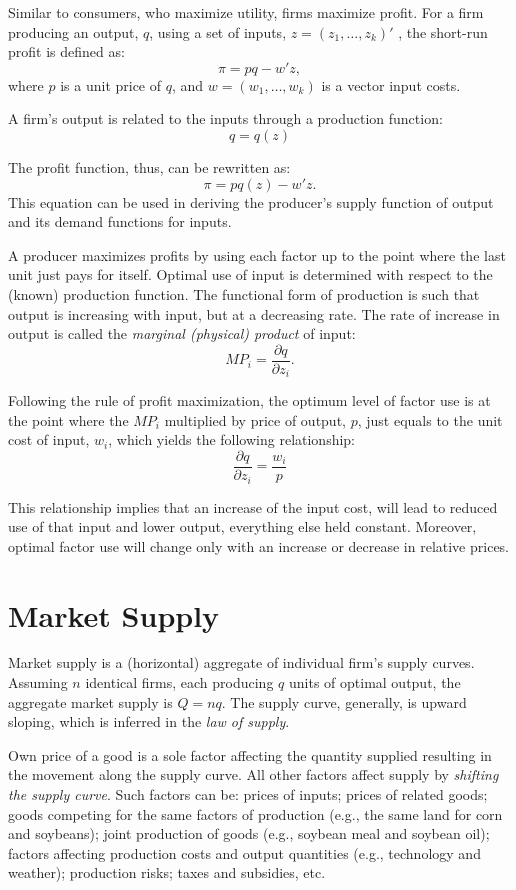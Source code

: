 \documentclass[
  oneside]{book}
\begin{document}
Similar to consumers, who maximize utility, firms maximize profit. For a firm producing an output, \(q\), using a set of inputs, \(z=(z_1,\ldots,z_k)'\) , the short-run profit is defined as: \[\pi = pq-w'z,\] where \(p\) is a unit price of \(q\), and \(w=(w_1,\ldots,w_k)\) is a vector input costs.

A firm's output is related to the inputs through a production function: \[q = q(z)\]

The profit function, thus, can be rewritten as: \[\pi = pq(z)-w'z.\] This equation can be used in deriving the producer's supply function of output and its demand functions for inputs.

A producer maximizes profits by using each factor up to the point where the last unit just pays for itself. Optimal use of input is determined with respect to the (known) production function. The functional form of production is such that output is increasing with input, but at a decreasing rate. The rate of increase in output is called the \emph{marginal (physical) product} of input: \[MP_i=\frac{\partial q}{\partial z_i}.\]

Following the rule of profit maximization, the optimum level of factor use is at the point where the \(MP_i\) multiplied by price of output, \(p\), just equals to the unit cost of input, \(w_i\), which yields the following relationship:\[\frac{\partial q}{\partial z_i} = \frac{w_i}{p}\]

This relationship implies that an increase of the input cost, will lead to reduced use of that input and lower output, everything else held constant. Moreover, optimal factor use will change only with an increase or decrease in relative prices.

\hypertarget{market-supply}{%
\section{Market Supply}\label{market-supply}}

Market supply is a (horizontal) aggregate of individual firm's supply curves. Assuming \(n\) identical firms, each producing \(q\) units of optimal output, the aggregate market supply is \(Q = nq\). The supply curve, generally, is upward sloping, which is inferred in the \emph{law of supply}.

Own price of a good is a sole factor affecting the quantity supplied resulting in the movement along the supply curve. All other factors affect supply by \emph{shifting the supply curve}. Such factors can be: prices of inputs; prices of related goods; goods competing for the same factors of production (e.g., the same land for corn and soybeans); joint production of goods (e.g., soybean meal and soybean oil); factors affecting production costs and output quantities (e.g., technology and weather); production risks; taxes and subsidies, etc.
\end{document}
